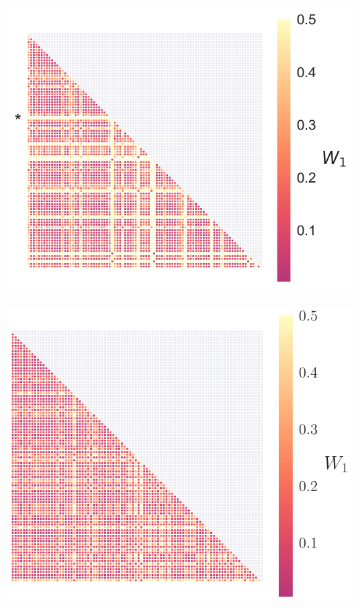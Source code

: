 \documentclass[fleqn,usenatbib,useAMS]{mnras}
\providecommand{\DIFadd}[1]{{\protect\color{blue}\uwave{#1}}} %
\providecommand{\DIFaddFL}[1]{\DIFadd{#1}} %
\begin{document}
\begin{figure}
\begin{subfigure}[b]{0.22\textwidth}
		\caption{\DIFaddFL{$\Phi_0$}}
	\end{subfigure}
	\hfill	
	\begin{subfigure}[b]{0.22\textwidth}
		\includegraphics[width=\textwidth]{images/WD_2}
		\caption{\DIFaddFL{$\psi$}} \label{figWD_psi}
	\end{subfigure}
	\hfill
	\begin{subfigure}[b]{0.22\textwidth}
		\includegraphics[width=\textwidth]{images/WD_3}
		\caption{\DIFaddFL{$\iota$}}
	\end{subfigure}

\end{figure}
\end{document}
